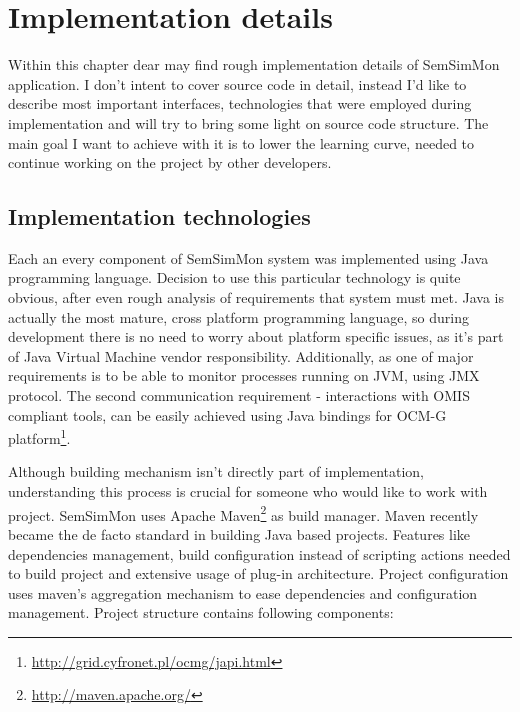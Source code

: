  
%


\chapter{Implementation details}
\label{cha:implementation}

Within this chapter dear may find rough implementation details of SemSimMon application. I don't intent to cover
source code in detail, instead I'd like to describe most important interfaces, technologies  that were
employed during implementation and will try to bring some light on source code structure. The main goal I want to
achieve with it is to lower the learning curve, needed to continue working on the project by other developers.


\section{Implementation technologies}

Each an every component of SemSimMon system was implemented using Java programming language. Decision to use this
particular technology is quite obvious, after even rough analysis of requirements that system must met. Java is
actually the most mature, cross platform programming language, so during development there is no need to worry about
platform specific issues, as it's part of Java Virtual Machine vendor responsibility. Additionally, as one of major
requirements is to be able to monitor processes running on JVM, using JMX protocol. The second communication
requirement - interactions with OMIS compliant tools, can be easily achieved using Java bindings for OCM-G
platform\footnote{\url{http://grid.cyfronet.pl/ocmg/japi.html}}.  

Although building mechanism isn't directly part of implementation, understanding this process is crucial for someone
who would like to work with project. SemSimMon uses Apache Maven\footnote{\url{http://maven.apache.org/}} as build
manager. Maven recently became the de facto standard in building Java based projects. Features like dependencies
management, build configuration instead of scripting actions needed to build project and extensive usage of plug-in
architecture. Project configuration uses maven's aggregation mechanism to ease dependencies and configuration
management. Project structure contains following components:
 


